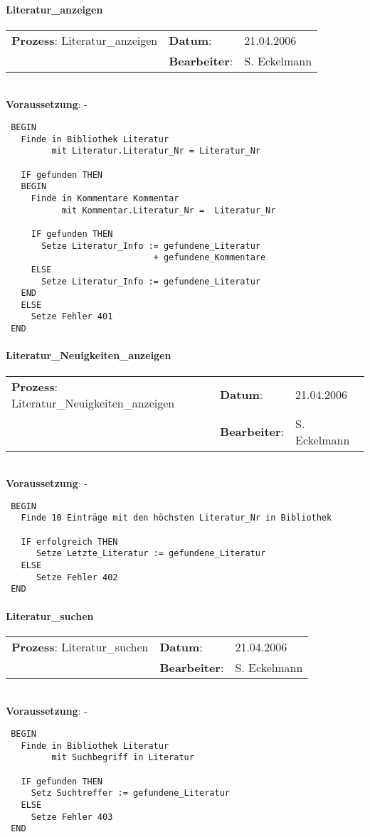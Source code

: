 \paragraph{Literatur\_anzeigen}
\begin{tabular}[t]{p{9.5cm}ll}
\textbf{Prozess}: Literatur\_anzeigen  	&\textbf{Datum}:      &21.04.2006\\
					&\textbf{Bearbeiter}: &S. Eckelmann\\
\end{tabular}

\hrulefill\\
\textbf{Voraussetzung}: -
\begin{verbatim}
 BEGIN
   Finde in Bibliothek Literatur
         mit Literatur.Literatur_Nr = Literatur_Nr

   IF gefunden THEN
   BEGIN
     Finde in Kommentare Kommentar
           mit Kommentar.Literatur_Nr =  Literatur_Nr

     IF gefunden THEN
       Setze Literatur_Info := gefundene_Literatur
                             + gefundene_Kommentare
     ELSE
       Setze Literatur_Info := gefundene_Literatur
   END
   ELSE
     Setze Fehler 401
 END
\end{verbatim}
\hrulefill

\paragraph{Literatur\_Neuigkeiten\_anzeigen}
\begin{tabular}[t]{p{9.5cm}ll}
\textbf{Prozess}: Literatur\_Neuigkeiten\_anzeigen  	&\textbf{Datum}:      &21.04.2006\\
					&\textbf{Bearbeiter}: &S. Eckelmann\\
\end{tabular}

\hrulefill\\
\textbf{Voraussetzung}: -
\begin{verbatim}
 BEGIN
   Finde 10 Einträge mit den höchsten Literatur_Nr in Bibliothek

   IF erfolgreich THEN
      Setze Letzte_Literatur := gefundene_Literatur
   ELSE
      Setze Fehler 402
 END
\end{verbatim}
\hrulefill


\paragraph{Literatur\_suchen}
\begin{tabular}[t]{p{9.5cm}ll}
\textbf{Prozess}: Literatur\_suchen  	&\textbf{Datum}:      &21.04.2006\\
					&\textbf{Bearbeiter}: &S. Eckelmann\\
\end{tabular}

\hrulefill\\
\textbf{Voraussetzung}: -
\begin{verbatim}
 BEGIN
   Finde in Bibliothek Literatur
         mit Suchbegriff in Literatur
   
   IF gefunden THEN
     Setz Suchtreffer := gefundene_Literatur
   ELSE
     Setze Fehler 403
 END
\end{verbatim}
\hrulefill